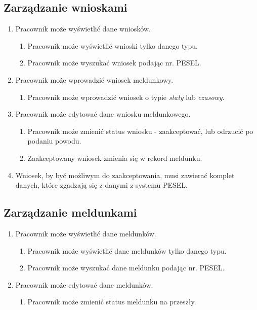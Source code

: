 \documentclass[12pt]{article}
\begin{document}
\subsection{Zarządzanie wnioskami}
\begin{enumerate}
    \item Pracownik może wyświetlić dane wniosków.
    \begin{enumerate}
        \item Pracownik może wyświetlić wnioski tylko danego typu.
        \item Pracownik może wyszukać wniosek podając nr. PESEL.
    \end{enumerate}
    \item Pracownik może wprowadzić wniosek meldunkowy.
    \begin{enumerate}
        \item Pracownik może wprowadzić wniosek o typie \textit{stały} lub \textit{czasowy}.
    \end{enumerate}
    \item Pracownik może edytować dane wniosku meldunkowego.
    \begin{enumerate}
        \item Pracownik może zmienić status wniosku - zaakceptować, lub odrzucić po podaniu powodu.
        \item Zaakceptowany wniosek zmienia się w rekord meldunku.
    \end{enumerate}
    \item Wniosek, by być możliwym do zaakceptowania, musi zawierać komplet danych, które zgadzają się z danymi z systemu PESEL.
\end{enumerate}
\subsection{Zarządzanie meldunkami}
\begin{enumerate}
    \item Pracownik może wyświetlić dane meldunków.
    \begin{enumerate}
        \item Pracownik może wyświetlić dane meldunków tylko danego typu.
        \item Pracownik może wyszukać dane meldunku podając nr. PESEL.
    \end{enumerate}
    \item Pracownik może edytować dane meldunków.
    \begin{enumerate}
        \item Pracownik może zmienić status meldunku na przeszły.
    \end{enumerate}
\end{enumerate}
\end{document}
